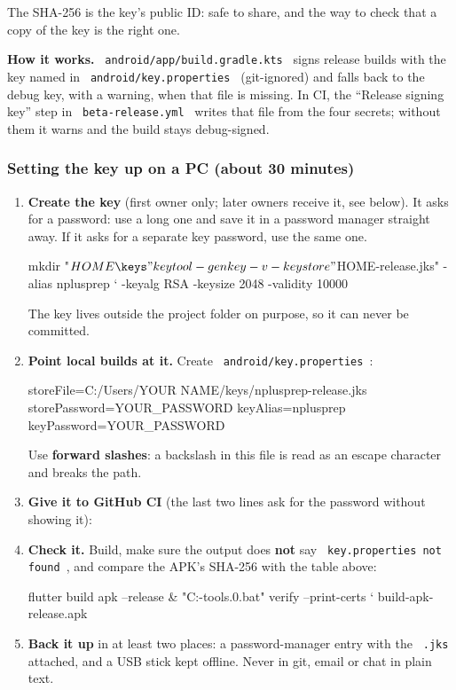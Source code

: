 \documentclass[12pt,a4paper]{article}
\newcommand{\codebs}{\symbol{92}\penalty50\relax}
\newcommand{\code}[1]{\texttt{\let\textbackslash\codebs\XeTeXinterchartokenstate=1 #1\XeTeXinterchartokenstate=0 }}
\begin{document}
The SHA-256 is the key's public ID: safe to share, and the way to check that a copy of the key is the right one.

\textbf{How it works.} \code{android/app/build.gradle.kts} signs release builds with the key named in \code{android/key.properties} (git-ignored) and falls back to the debug key, with a warning, when that file is missing. In CI, the ``Release signing key'' step in \code{beta-release.yml} writes that file from the four secrets; without them it warns and the build stays debug-signed.

\subsubsection{Setting the key up on a PC (about 30 minutes)}

\begin{enumerate}
\item \textbf{Create the key} (first owner only; later owners receive it, see below). It asks for a password: use a long one and save it in a password manager straight away. If it asks for a separate key password, use the same one.
\begin{shell}
mkdir "$HOME\keys"
keytool -genkey -v -keystore "$HOME\keys\nplusprep-release.jks" -alias nplusprep `
  -keyalg RSA -keysize 2048 -validity 10000
\end{shell}
The key lives outside the project folder on purpose, so it can never be committed.
\item \textbf{Point local builds at it.} Create \code{android/key.properties}:
\begin{shell}
storeFile=C:/Users/YOUR NAME/keys/nplusprep-release.jks
storePassword=YOUR_PASSWORD
keyAlias=nplusprep
keyPassword=YOUR_PASSWORD
\end{shell}
Use \textbf{forward slashes}: a backslash in this file is read as an escape character and breaks the path.
\item \textbf{Give it to GitHub CI} (the last two lines ask for the password without showing it):
\item \textbf{Check it.} Build, make sure the output does \textbf{not} say \code{key.properties not found}, and compare the APK's SHA-256 with the table above:
\begin{shell}
flutter build apk --release
& "C:\Android\Sdk\build-tools.0\apksigner.bat" verify --print-certs `
  build\app\outputs\flutter-apk\app-release.apk
\end{shell}
\item \textbf{Back it up} in at least two places: a password-manager entry with the \code{.jks} attached, and a USB stick kept offline. Never in git, email or chat in plain text.
\end{enumerate}
\end{document}
